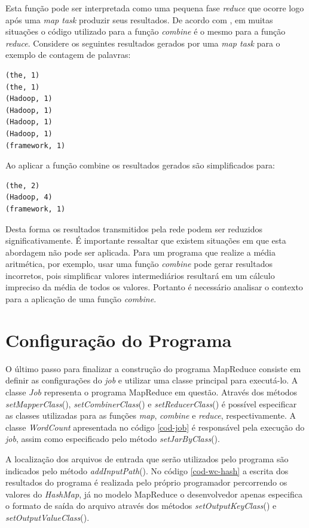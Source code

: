 Esta função pode ser interpretada como uma pequena fase \textit{reduce} que ocorre logo após uma \textit{map task} produzir seus resultados. De acordo com , em muitas situações o código utilizado para a função \textit{combine} é o mesmo para a função \textit{reduce}. Considere os seguintes resultados gerados por uma \textit{map task} para o exemplo de contagem de palavras:

\begin{lstlisting}[style=abnt,frame=none]
(the, 1)
(the, 1)
(Hadoop, 1)
(Hadoop, 1)
(Hadoop, 1)
(Hadoop, 1)
(framework, 1)
\end{lstlisting}

Ao aplicar a função combine os resultados gerados são simplificados para:

\begin{lstlisting}[style=abnt,frame=none]
(the, 2)
(Hadoop, 4)
(framework, 1)
\end{lstlisting}

Desta forma os resultados transmitidos pela rede podem ser reduzidos significativamente. É importante ressaltar que existem situações em que esta abordagem não pode ser aplicada. Para um programa que realize a média aritmética, por exemplo, usar uma função \textit{combine} pode gerar resultados incorretos, pois simplificar valores intermediários resultará em um cálculo impreciso da média de todos os valores. Portanto é necessário analisar o contexto para a aplicação de uma função \textit{combine}.

\section{Configuração do Programa}

O último passo para finalizar a construção do programa MapReduce consiste em definir as configurações do \textit{job} e utilizar uma classe principal para executá-lo. A classe \textit{Job} representa o programa MapReduce em questão. Através dos métodos \textit{setMapperClass}(), \textit{setCombinerClass}() e \textit{setReducerClass}() é possível especificar as classes utilizadas para as funções \textit{map}, \textit{combine} e \textit{reduce}, respectivamente. A classe \textit{WordCount} apresentada no código \ref{cod-job} é responsável pela execução do \textit{job}, assim como especificado pelo método \textit{setJarByClass}().

A localização dos arquivos de entrada que serão utilizados pelo programa são indicados pelo método \textit{addInputPath}(). No código \ref{cod-wc-hash} a escrita dos resultados do programa é realizada pelo próprio programador percorrendo os valores do \textit{HashMap}, já no modelo MapReduce o desenvolvedor apenas especifica o formato de saída do arquivo através dos métodos \textit{setOutputKeyClass}() e \textit{setOutputValueClass}().

